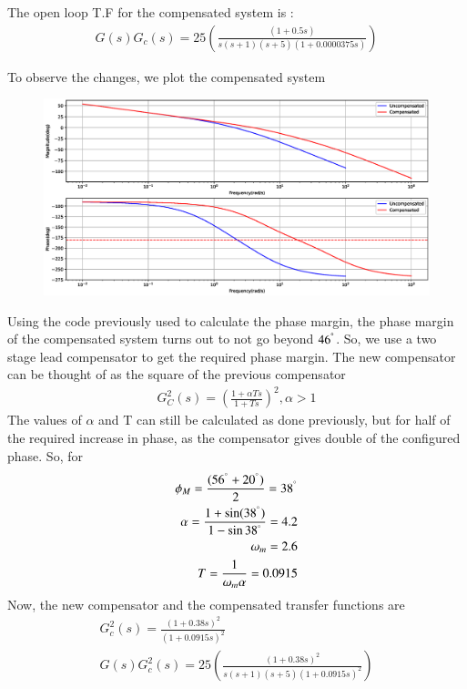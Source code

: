 \begin{enumerate}[label=\thesection.\arabic*.,ref=\thesection.\theenumi]
The open loop T.F for the compensated system is  :
\begin{align}
    G(s) G_{c}(s) = 25\left(\frac{(1+0.5s)}{s(s+1)(s+5)(1+0.0000375s)}\right)
\end{align}


To observe the changes, we plot the compensated system

\begin{figure}[!ht]
    \centering
    \includegraphics[width=\columnwidth]{./figs/ee18btech11051/ee18btech11051_fig2.eps}
    \label{fig:ee18btech11051_2}
\end{figure}

Using the code previously used to calculate the phase margin, the phase margin of the compensated system turns out to not go beyond $46^{\degree}$. So, we use a two stage lead compensator to get the required phase margin. The new compensator can be thought of as the square of the previous compensator 
\begin{align}
    G_{C}^{2}(s) = \left(\frac{1+\alpha Ts} {1+Ts}\right)^{2}, \alpha >1
\end{align}
The values of $\alpha$ and T can still be calculated as done previously, but for half of the required increase in phase, as the compensator gives double of the configured phase. So, for
\begin{align}
    \phi_{M} = \frac{(56^{\degree}+20^{\degree})}{2} = 38^{\degree}\\
    \alpha = \frac{1+\sin(38^{\degree})}{1-\sin{38^{\degree}}} = 4.2\\
    \omega_{m} = 2.6\\
    T = \frac{1}{\omega_{m}\alpha} = 0.0915
\end{align}
Now, the new compensator and the compensated transfer functions are
\begin{align}
    G_{c}^{2}(s) = \frac{(1 + 0.38s)^{2}}{(1 + 0.0915s)^{2}}\\
    G(s) G_{c}^{2}(s) = 25\left(\frac{(1+0.38s)^{2}}{s(s+1)(s+5)(1+0.0915s)^{2}}\right)
\end{align}



\end{enumerate}
